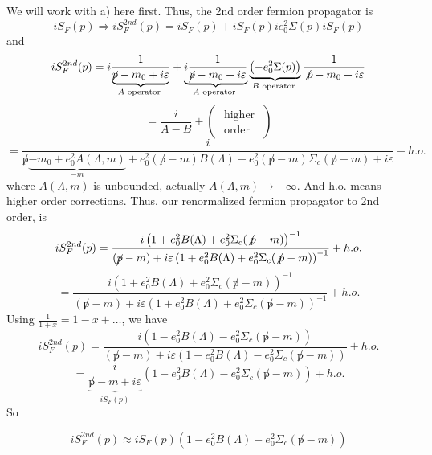  We will work with a) here first. Thus, the 2nd order fermion propagator is
 \begin{equation}i S_{F}(p) \Rightarrow i S_{F}^{2 n d}(p)=i S_{F}(p)+i S_{F}(p) i e_{0}^{2} \Sigma(p) i S_{F}(p)\end{equation}
 and 
 $$i S_{F}^{2 n d}(p)=i \frac{1}{\underbrace{\cancel{p}-m_{0}+i \varepsilon}_{A \text { operator }}}+\underbrace{i \frac{1}{\cancel{p}-m_{0}+i \varepsilon}}_{A \text { operator }} \underbrace{\left(-e_{0}^{2} \Sigma(p)\right)}_{B \text { operator }}\frac{1}{\not p-m_{0}+i \varepsilon}$$
 $$=\frac{i}{A-B}+\left(\begin{array}{l}
\text { higher } \\
\text { order }
\end{array}\right)$$
$$=\frac{i}{\not p\underbrace{-m_{0}+e_{0}^{2} A(\Lambda, m)}_{-m}+e_{0}^{2}(\not p-m) B(\Lambda)+e_{0}^{2}(\not p-m) \Sigma_{c}(\not p-m)+i \varepsilon}+h.o.$$
where $A(\Lambda, m)$ is unbounded, actually $A(\Lambda, m) \rightarrow-\infty$. And h.o. means higher order corrections. Thus, our renormalized fermion propagator to 2nd order, is
$$
i S_{F}^{2 n d}(p)=\frac{i\left(1+e_{0}^{2} B(\Lambda)+e_{0}^{2} \Sigma_{c}(\not p-m)\right)^{-1}}{(\cancel{p}-m)+i \varepsilon\left(1+e_{0}^{2} B(\Lambda)+e_{0}^{2} \Sigma_{c}(\not p-m)\right)^{-1}}+h.o.
$$
$$
=\frac{i\left(1+e_{0}^{2} B(\Lambda)+e_{0}^{2} \Sigma_{c}(\not p-m)\right)^{-1}}{(\not p-m)+i \varepsilon\left(1+e_{0}^{2} B(\Lambda)+e_{0}^{2} \Sigma_{c}(\not p-m)\right)^{-1}}+h.o.
$$
Using $\frac{1}{1+x}=1-x+\ldots$, we have
$$
iS_{F}^{2nd}(p)=\frac{i\left(1-e_{0}^{2} B(\Lambda)-e_{0}^{2} \Sigma_{c}(\not p-m)\right)}{(\not p-m)+i \varepsilon\left(1-e_{0}^{2} B(\Lambda)-e_{0}^{2} \Sigma_{c}(\not p-m)\right)}+h.o.$$
$$=\underbrace{\frac{i}{\not p-m+i \varepsilon}}_{i S_{F}(p)}\left(1-e_{0}^{2} B(\Lambda)-e_{0}^{2} \Sigma_{c}(\not p-m)\right)+h.o.$$
So
\begin{qt}
    \begin{equation}
        iS_{F}^{2nd}(p)\approx i S_{F}(p)\left(1-e_{0}^{2} B(\Lambda)-e_{0}^{2} \Sigma_{c}(\not p-m)\right)
    \end{equation}
\end{qt}

